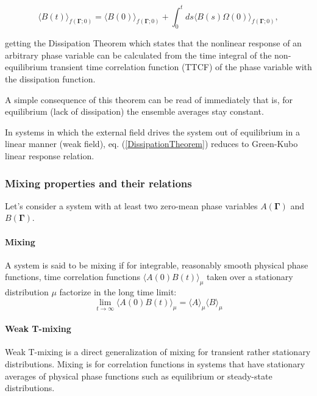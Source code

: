 \documentclass[a4paper,12pt,nofootinbib]{article}
\begin{document}
\begin{equation}
\langle B(t)\rangle_{f(\bm{\Gamma};0)} =\langle B(0) \rangle_{f(\bm{\Gamma};0)} +\int_0^t ds \langle B(s) \Omega(0) \rangle_{f(\bm{\Gamma};0)}, \label{DissipationTheorem}
\end{equation}

getting the Dissipation Theorem which states that the nonlinear response of an arbitrary phase variable can be calculated from the time integral of the non-equilibrium transient time correlation function (TTCF) of the phase variable with the dissipation function.




A simple consequence of this theorem can be read of immediately that is, for equilibrium (lack of dissipation) the ensemble averages stay constant.

In systems in which the external field drives the system out of equilibrium in a linear manner (weak field), eq. (\ref{DissipationTheorem}) reduces to Green-Kubo linear response relation.

\subsubsection{Mixing properties and their relations}

Let's consider a system with at least two zero-mean phase variables $A(\bm{\Gamma})$ and $B(\bm{\Gamma})$. 

\paragraph{Mixing}

A system is said to be mixing if for integrable, reasonably smooth physical phase functions, time correlation functions $\langle A(0) B(t) \rangle_{\mu}$ taken over a stationary distribution $\mu$ factorize in the long time limit:
\begin{equation}
  \lim_{t \to \infty} \langle A(0) B(t)\rangle_{\mu} = \langle A \rangle_{\mu} \langle B \rangle_{\mu}  
\end{equation}

\paragraph{Weak T-mixing}

Weak T-mixing is a direct generalization of mixing for transient rather stationary distributions. Mixing is for correlation functions in systems that have stationary averages of physical phase functions such as equilibrium or steady-state distributions.
\end{document}
